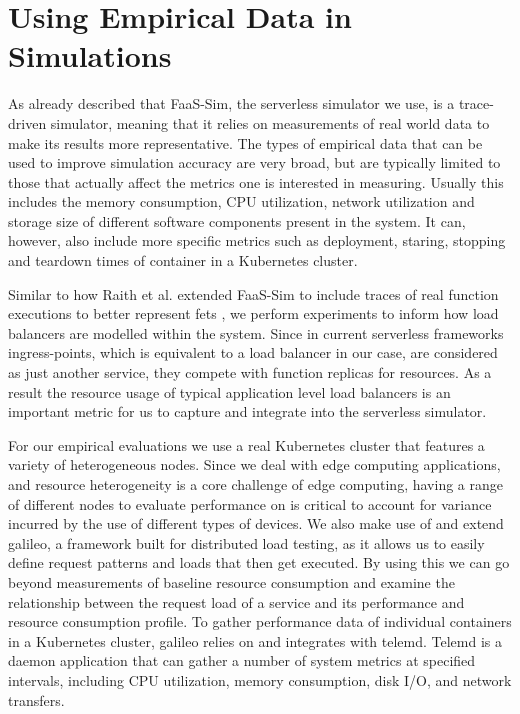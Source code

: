 \section{Using Empirical Data in Simulations}
As already described that FaaS-Sim\cite{faas-sim-github}, the serverless simulator we use, is a trace-driven simulator\cite{thomas-thesis}, meaning that it relies on measurements of real world data to make its results more representative.
The types of empirical data that can be used to improve simulation accuracy are very broad, but are typically limited to those that actually affect the metrics one is interested in measuring.
Usually this includes the memory consumption, CPU utilization, network utilization and storage size of different software components present in the system.
It can, however, also include more specific metrics such as deployment, staring, stopping and teardown times of container in a Kubernetes cluster\cite{skippy}.

Similar to how Raith et al. extended FaaS-Sim to include traces of real function executions to better represent \glspl{fet} \cite{philipp-da}, we perform experiments to inform how load balancers are modelled within the system.
Since in current serverless frameworks ingress-points, which is equivalent to a load balancer in our case, are considered as just another service, they compete with function replicas for resources.
As a result the resource usage of typical application level load balancers is an important metric for us to capture and integrate into the serverless simulator.

For our empirical evaluations we use a real Kubernetes cluster that features a variety of heterogeneous nodes.
Since we deal with edge computing applications, and resource heterogeneity is a core challenge of edge computing\cite{shiEdgeComputingVisionChallenges2016}, having a range of different nodes to evaluate performance on is critical to account for variance incurred by the use of different types of devices.
We also make use of and extend galileo\cite{galileo-github}\cite{operating-energy-aware-galileo}, a framework built for distributed load testing, as it allows us to easily define request patterns and loads that then get executed.
By using this we can go beyond measurements of baseline resource consumption and examine the relationship between the request load of a service and its performance and resource consumption profile.
To gather performance data of individual containers in a Kubernetes cluster, galileo relies on and integrates with telemd\cite{telemd-github}.
Telemd is a daemon application that can gather a number of system metrics at specified intervals, including CPU utilization, memory consumption, disk I/O, and network transfers.


%
%
